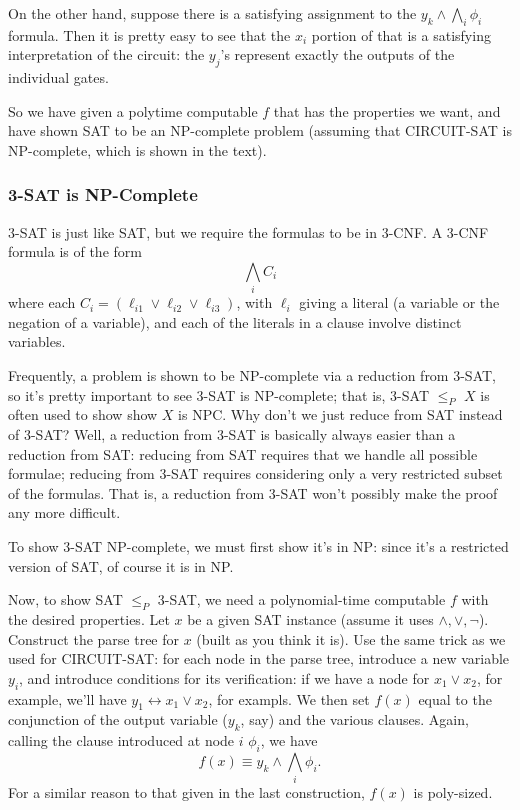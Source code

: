\documentclass{article}
\begin{document}
On the other hand, suppose there is a satisfying assignment to the
$
y_k \wedge \bigwedge_i \phi_i
$
formula. Then it is pretty easy to see that the $x_i$ portion of that
is a satisfying interpretation of the circuit: the $y_j$'s represent exactly
the outputs of the individual gates.

So we have given a polytime computable $f$ that has the properties we want,
and have shown SAT to be an NP-complete problem (assuming that CIRCUIT-SAT
is NP-complete, which is shown in the text).


\subsubsection{3-SAT is NP-Complete}

3-SAT is just like SAT, but we require the formulas to be in 3-CNF.
A 3-CNF formula is of the form
$$
\bigwedge_i C_i
$$
where each $C_i = (\ell_{i1} \vee \ell_{i2} \vee \ell_{i3})$, with
$\ell_i$ giving a literal (a variable or the negation of a variable), and
each of the literals in a clause involve distinct variables.

Frequently, a problem is shown to be NP-complete via a reduction from 3-SAT,
so it's pretty important to see 3-SAT is NP-complete; that is, 3-SAT $\leq_P$
$X$ is often used to show show $X$ is NPC.
Why don't we just reduce from SAT instead of 3-SAT?
Well, a reduction from 3-SAT is basically always easier than a reduction
from SAT: reducing from SAT requires that we handle all possible formulae;
reducing from 3-SAT requires considering only a very restricted subset
of the formulas.
That is, a reduction from 3-SAT won't possibly make the proof any more 
difficult.

To show 3-SAT NP-complete, we must first show it's in NP: since it's a 
restricted version of SAT, of course it is in NP.

Now, to show SAT $\leq_P$ 3-SAT, we need a polynomial-time computable
$f$ with the desired properties.
Let $x$ be a given SAT instance (assume it uses $\wedge,\vee,\neg$).
Construct the parse tree for $x$ (built as you think it is).
Use the same trick as we used for CIRCUIT-SAT: for each node in the parse
tree, introduce a new variable $y_i$, and introduce conditions for its
verification: if we have a node for $x_1\vee x_2$, for example, we'll have
$y_1\leftrightarrow x_1\vee x_2$, for exampls.
We then set $f(x)$ equal to the conjunction of the output variable ($y_k$, say)
and the various clauses.
Again, calling the clause introduced at node $i$ $\phi_i$, we have
$$
f(x) \equiv y_k \wedge
\bigwedge_i \phi_i.
$$
For a similar reason to that given in the last construction, $f(x)$ is
poly-sized.
\end{document}
